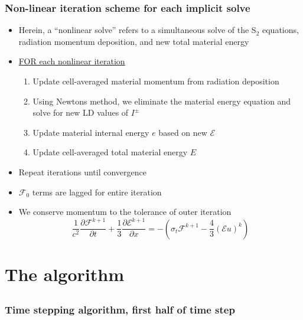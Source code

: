 \documentclass[xcolor=dvipsnames,fontsize=8pt]{beamer}
\newcommand{\E}{\mathcal{E}}
\newcommand{\F}{\mathcal{F}}
\newcommand{\coly}[1]{{\color{yellow} #1}}
\newcommand{\colb}[1]{{\color{blue} #1}}
\newlength{\wideitemsep}
\let\olditem\item
\renewcommand{\item}{\setlength{\itemsep}{\wideitemsep}\olditem}
\newcommand{\pderiv}[2]{\frac{\partial #1}{\partial #2}}
\begin{document}
\begin{frame}
    \frametitle{Non-linear iteration scheme for each \coly{implicit solve}} 
    \begin{itemize}
        \item Herein, a ``nonlinear solve'' refers to a simultaneous solve of the S$_2$ equations, radiation momentum deposition, and new total material energy
        \item \underline{FOR each nonlinear iteration}
    \begin{enumerate}
        \item Update cell-averaged material momentum from radiation deposition
        \item Using Newtons method, we eliminate the material energy equation and
            solve for new LD values of $I^\pm$
        \item Update material internal energy $e$ based on new $\E$
        \item Update cell-averaged total material energy $E$
    \end{enumerate}
        \item Repeat iterations until convergence
        \item $\F_{0}$ terms are lagged for entire iteration
        \item We \colb{conserve momentum} to the tolerance of outer iteration
            \begin{equation*}
                \frac{1}{c^2}\pderiv{\F^{k+1}}{t} + \frac{1}{3}\pderiv{\E^{k+1}}{x}
                = -\left(\sigma_t \F^{k+1} - \frac{4}{3}(\E u)^{k}\right)
            \end{equation*}
    \end{itemize}
\end{frame}
\section{The algorithm}
\subsection{}


\begin{frame}
    \frametitle{Time stepping algorithm, \coly{first half} of time step}
    \begin{figure}[h]
        \centering
        
    \end{figure}
\end{frame}
\end{document}
